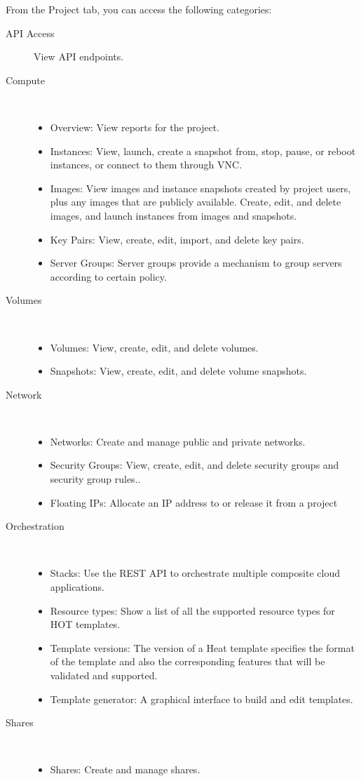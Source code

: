 From the Project tab, you can access the following categories:
\begin{description}
\item[API Access] View API endpoints.
\item[Compute]\ 
\begin{itemize}
\item
  Overview: View reports for the project.
\item
  Instances: View, launch, create a snapshot from, stop, pause, or
  reboot instances, or connect to them through VNC.
\item
  Images: View images and instance snapshots created by project users,
  plus any images that are publicly available. Create, edit, and delete
  images, and launch instances from images and snapshots.
\item
  Key Pairs: View, create, edit, import, and delete key pairs.
\item
  Server Groups: Server groups provide a mechanism to group servers according to certain policy.
\end{itemize}
\item[Volumes]\ 
\begin{itemize}
\item
  Volumes: View, create, edit, and delete volumes.
\item
  Snapshots: View, create, edit, and delete volume snapshots.
\end{itemize}
\item[Network]\ 
\begin{itemize}
\item
  Networks: Create and manage public and private networks.
\item
  Security Groups: View, create, edit, and delete security groups and
  security group rules..
\item
  Floating IPs: Allocate an IP address to or release it from a project
\end{itemize}
\item[Orchestration]\ 
  \begin{itemize}
\item
  Stacks: Use the REST API to orchestrate multiple composite cloud applications.
\item
  Resource types: Show a list of all the supported resource types for HOT templates.
\item
  Template versions: The version of a Heat template specifies the format of the template and also the corresponding features that will be validated and supported.
\item
  Template generator: A graphical interface to build and edit templates.
\end{itemize}
\item[Shares]\ 
\begin{itemize}
\item Shares: Create and manage \gls{share}s.
\end{itemize}
\end{description}


